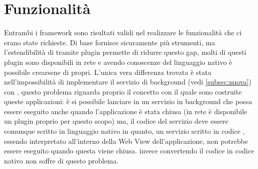     \section{Funzionalità}
    Entrambi i frame\-work sono risultati validi nel realizzare le
    funzionalità che ci erano state richieste. Di base \tisdk{} fornisce
    sicuramente più strumenti, ma l'estendibilità di \pg{} tramite plugin
    permette di ridurre questo gap, molti di questi plugin sono
    disponibili in rete e avendo conoscenze del linguaggio nativo è
    possibile crearsene di propri. L'unica vera differenza
    trovata è stata nell'impossibilità di implementare il servizio di
    background (vedi \ref{subsec:nuova}) con \pg{}, questo problema
    riguarda proprio il concetto con
    il quale sono costruite queste applicazioni: è si possibile lanciare
    in \js{}
    un servizio in background che possa essere eseguito anche quando
    l'applicazione è stata chiusa (in rete è disponibile un plugin proprio
    per questo scopo) ma, il codice del servizio deve essere comunque
    scritto in linguaggio nativo in quanto, un servizio scritto in codice
    \js{}, essendo interpretato all'interno della Web View
    dell'applicazione, non potrebbe essere eseguito quando questa viene
    chiusa.
    \tisdk{} invece convertendo il codice \js{} in codice nativo non
    soffre di questo problema.


